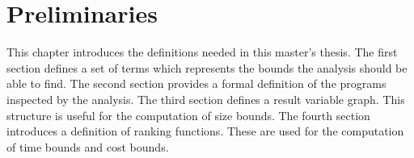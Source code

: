 \section{Preliminaries}

This chapter introduces the definitions needed in this master's thesis.
The first section defines a set of terms which represents the bounds the analysis should be able to find. 
The second section provides a formal definition of the programs inspected by the analysis.
The third section defines a result variable graph.
This structure is useful for the computation of size bounds.
The fourth section introduces a definition of ranking functions.
These are used for the computation of time bounds and cost bounds.









